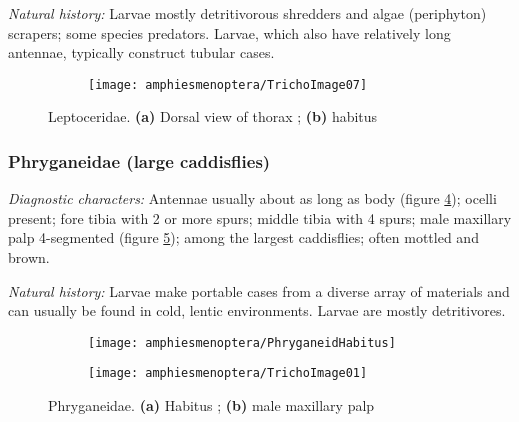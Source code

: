 \noindent{}\textit{Natural history:} Larvae mostly detritivorous shredders and algae (periphyton) scrapers; some species predators. Larvae, which also have relatively long antennae, typically construct tubular cases.

\begin{figure}[ht!]
    \centering
        \begin{subfigure}[ht!]{0.25\textwidth}
        \texttt{[image: amphiesmenoptera/TrichoImage07]}
        \caption{}
        \label{fig:lepto2}
    \end{subfigure}
   \hfill 
        \begin{subfigure}[ht!]{0.68\textwidth}
        \caption{}
        \label{fig:lepto1}
    \end{subfigure}
\caption{Leptoceridae. \textbf{(a)} Dorsal view of thorax \citep[][Fig. 82]{bhl50956}; \textbf{(b)} habitus \citep[][Fig. 863]{bhl50956}}\label{fig:leptoc}
\end{figure}

\subsubsection{Phryganeidae (large caddisflies)}
\noindent{}\textit{Diagnostic characters:} Antennae usually about as long as body (figure \ref{fig:phrygan1}); ocelli present; fore tibia with 2 or more spurs; middle tibia with 4 spurs; male maxillary palp 4-segmented (figure \ref{fig:phrygan2}); among the largest caddisflies; often mottled and brown.\vspace{3mm}

\noindent{}\textit{Natural history:} Larvae make portable cases from a diverse array of materials and can usually be found in cold, lentic environments. Larvae are mostly detritivores.

\begin{figure}[ht!]
    \centering
    \begin{subfigure}[ht!]{0.68\textwidth}
        \texttt{[image: amphiesmenoptera/PhryganeidHabitus]}
        \caption{}
        \label{fig:phrygan1}
    \end{subfigure}
    \hfill
    \begin{subfigure}[ht!]{0.25\textwidth}
        \texttt{[image: amphiesmenoptera/TrichoImage01]}
        \caption{}
        \label{fig:phrygan2}
    \end{subfigure}
    \caption{Phryganeidae. \textbf{(a)} Habitus \citep[][Fig. 591]{bhl50956}; \textbf{(b)} male maxillary palp \citep[][Fig. 64]{bhl50956}}\label{fig:phrygan}
\end{figure}

